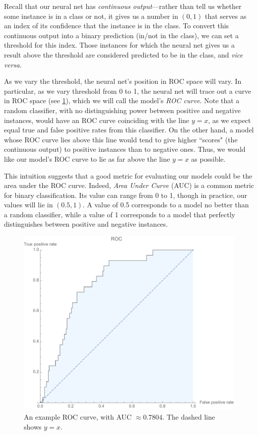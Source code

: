 \documentclass[10pt]{article}
\begin{document}
Recall that our neural net has \emph{continuous output}---rather than tell us whether some instance is in a class or not, it gives us a number in $(0, 1)$ that serves as an index of its confidence that the instance is in the class.
To convert this continuous output into a binary prediction (in/not in the class), we can set a threshold for this index.
Those instances for which the neural net gives us a result above the threshold are considered predicted to be in the class, and \emph{vice versa}.

As we vary the threshold, the neural net's position in ROC space will vary.
In particular, as we vary threshold from 0 to 1, the neural net will trace out a curve in ROC space (see \cref{fig:rocexample}), which we will call the model's \emph{ROC curve}.
Note that a random classifier, with no distinguishing power between positive and negative instances, would have an ROC curve coinciding with the line $y = x$, as we expect equal true and false positive rates from this classifier.
On the other hand, a model whose ROC curve lies above this line would tend to give higher ``scores" (the continuous output) to positive instances than to negative ones.
Thus, we would like our model's ROC curve to lie as far above the line $y = x$ as possible.

This intuition suggests that a good metric for evaluating our models could be the area under the ROC curve.
Indeed, \emph{Area Under Curve} (AUC) is a common metric for binary classification.
Its value can range from 0 to 1, though in practice, our values will lie in $(0.5, 1)$.
A value of 0.5 corresponds to a model no better than a random classifier, while a value of 1 corresponds to a model that perfectly distinguishes between positive and negative instances.

\begin{figure}
\centering
\includegraphics[width=\textwidth]{aux/rocexample.pdf}
\caption{An example ROC curve, with AUC $\approx 0.7804$. The dashed line shows $y = x$.}
\label{fig:rocexample}
\end{figure}
\end{document}
